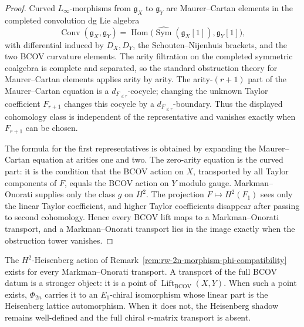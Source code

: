 \begin{proof}
Curved \(L_\infty\)-morphisms from \(\mathfrak g_X\) to
\(\mathfrak g_Y\) are Maurer--Cartan elements in the completed
convolution dg Lie algebra
\[
 \operatorname{Conv}(\mathfrak g_X,\mathfrak g_Y)
 =
 \operatorname{Hom}
 \bigl(\widehat{\operatorname{Sym}}(\mathfrak g_X[1]),
 \mathfrak g_Y[1]\bigr),
\]
with differential induced by \(D_X,D_Y\), the Schouten--Nijenhuis
brackets, and the two BCOV curvature elements. The arity filtration on
the completed symmetric coalgebra is complete and separated, so the
standard obstruction theory for Maurer--Cartan elements applies
arity by arity. The arity-\((r+1)\) part of the Maurer--Cartan equation
is a \(d_{F_{\le r}}\)-cocycle; changing the unknown Taylor coefficient
\(F_{r+1}\) changes this cocycle by a \(d_{F_{\le r}}\)-boundary.
Thus the displayed cohomology class is independent of the representative
and vanishes exactly when \(F_{r+1}\) can be chosen.

The formula for the first representatives is obtained by expanding the
Maurer--Cartan equation at arities one and two. The zero-arity equation
is the curved part: it is the condition that the BCOV action on \(X\),
transported by all Taylor components of \(F\), equals the BCOV action on
\(Y\) modulo gauge. Markman--Onorati supplies only the class \(g\) on
\(H^2\). The projection \(F\mapsto H^2(F_1)\) sees only the linear
Taylor coefficient, and higher Taylor coefficients disappear after
passing to second cohomology. Hence every BCOV lift maps to a
Markman--Onorati transport, and a Markman--Onorati transport lies in the
image exactly when the obstruction tower vanishes.
\end{proof}

\begin{remark}
\label{rem:chain-level-markman-compare}
The \(H^2\)-Heisenberg action of
Remark~\ref{rem:rw-2n-morphism-phi-compatibility} exists for every
Markman--Onorati transport. A transport of the full BCOV datum is a
stronger object: it is a point of
\(\operatorname{Lift}_{\mathrm{BCOV}}(X,Y)\). When such a point exists,
\(\Phi_{2n}\) carries it to an \(E_1\)-chiral isomorphism whose
linear part is the Heisenberg lattice automorphism. When it does not,
the Heisenberg shadow remains well-defined and the full chiral
\(r\)-matrix transport is absent.
\end{remark}

